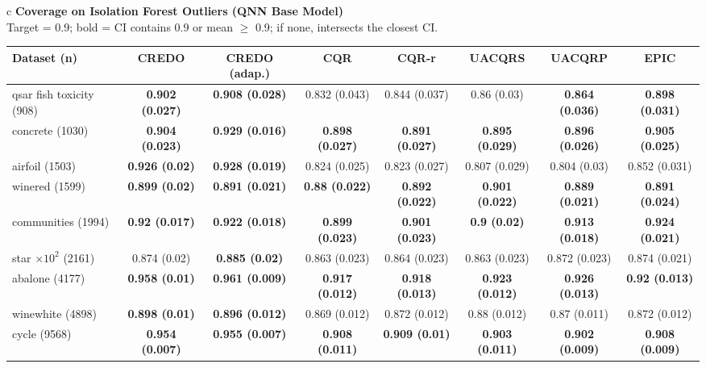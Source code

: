 \documentclass[border=6pt]{standalone}
\begin{document}
\begin{adjustbox}{max width=\linewidth}
\begin{tabular}{c}
{\small\textbf{Coverage on Isolation Forest Outliers (QNN Base Model)}}\\[-1pt]
{\scriptsize Target = 0.9; bold = CI contains 0.9 or mean $\geq$ 0.9; if none, intersects the closest CI.}\\[2pt]
\scriptsize\begin{tabular}{lccccccc}
\hline
Dataset (n) & \textbf{CREDO} & \textbf{CREDO (adap.)} & \textbf{CQR} & \textbf{CQR-r} & \textbf{UACQRS} & \textbf{UACQRP} & \textbf{EPIC}\\ \hline
qsar fish toxicity (908) & \textbf{0.902 (0.027)} & \textbf{0.908 (0.028)} & 0.832 (0.043) & 0.844 (0.037) & 0.86 (0.03) & \textbf{0.864 (0.036)} & \textbf{0.898 (0.031)}\\
concrete (1030) & \textbf{0.904 (0.023)} & \textbf{0.929 (0.016)} & \textbf{0.898 (0.027)} & \textbf{0.891 (0.027)} & \textbf{0.895 (0.029)} & \textbf{0.896 (0.026)} & \textbf{0.905 (0.025)}\\
airfoil (1503) & \textbf{0.926 (0.02)} & \textbf{0.928 (0.019)} & 0.824 (0.025) & 0.823 (0.027) & 0.807 (0.029) & 0.804 (0.03) & 0.852 (0.031)\\
winered (1599) & \textbf{0.899 (0.02)} & \textbf{0.891 (0.021)} & \textbf{0.88 (0.022)} & \textbf{0.892 (0.022)} & \textbf{0.901 (0.022)} & \textbf{0.889 (0.021)} & \textbf{0.891 (0.024)}\\
communities (1994) & \textbf{0.92 (0.017)} & \textbf{0.922 (0.018)} & \textbf{0.899 (0.023)} & \textbf{0.901 (0.023)} & \textbf{0.9 (0.02)} & \textbf{0.913 (0.018)} & \textbf{0.924 (0.021)}\\
star $\times 10^2$ (2161) & 0.874 (0.02) & \textbf{0.885 (0.02)} & 0.863 (0.023) & 0.864 (0.023) & 0.863 (0.023) & 0.872 (0.023) & 0.874 (0.021)\\
abalone (4177) & \textbf{0.958 (0.01)} & \textbf{0.961 (0.009)} & \textbf{0.917 (0.012)} & \textbf{0.918 (0.013)} & \textbf{0.923 (0.012)} & \textbf{0.926 (0.013)} & \textbf{0.92 (0.013)}\\
winewhite (4898) & \textbf{0.898 (0.01)} & \textbf{0.896 (0.012)} & 0.869 (0.012) & 0.872 (0.012) & 0.88 (0.012) & 0.87 (0.011) & 0.872 (0.012)\\
cycle (9568) & \textbf{0.954 (0.007)} & \textbf{0.955 (0.007)} & \textbf{0.908 (0.011)} & \textbf{0.909 (0.01)} & \textbf{0.903 (0.011)} & \textbf{0.902 (0.009)} & \textbf{0.908 (0.009)}\\

\end{tabular}
\end{tabular}
\end{adjustbox}
\end{document}
